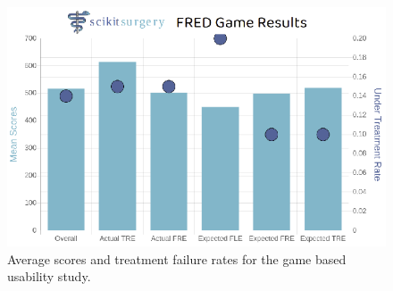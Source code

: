 \begin{figure}
        \begin{center}
        \includegraphics[width=0.5\linewidth]{usability.eps}
                \caption{\label{fig:usability}Average scores and treatment failure rates for the game based usability study.}
	\end{center}
\end{figure}



